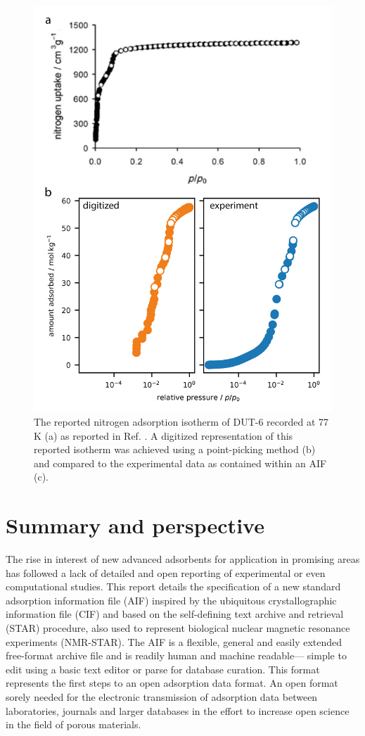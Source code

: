 \documentclass[journal=langd5,manuscript=article]{achemso}
\begin{document}
  
  \begin{figure}[htb]
    \includegraphics{./figures/example-01.png}
      \caption{The reported nitrogen adsorption isotherm of DUT-6 recorded at 77$\,$K (a) as reported in Ref. . A digitized representation of this reported isotherm was achieved using a point-picking method (b) and compared to the experimental data as contained within an AIF (c).}
      \label{fgr:example}
    \end{figure}


\section{Summary and perspective}
The rise in interest of new advanced adsorbents for application in promising areas has followed a lack of detailed and open reporting of experimental or even computational studies.
This report details the specification of a new standard adsorption information file (AIF) inspired by the ubiquitous crystallographic information file (CIF) and based on the self-defining text archive and retrieval (STAR) procedure, also used to represent biological nuclear magnetic resonance experiments (NMR-STAR).
The AIF is a flexible, general and easily extended free-format archive file and is readily human and machine readable--- simple to edit using a basic text editor or parse for database curation.
This format represents the first steps to an open adsorption data format.
An open format sorely needed for the electronic transmission of adsorption data between laboratories, journals and larger databases in the effort to increase open science in the field of porous materials. 
\end{document}
